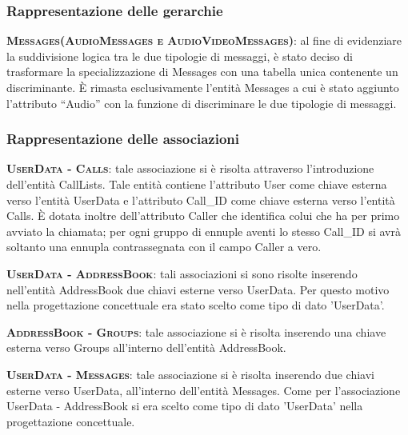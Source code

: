 \subsubsection{Rappresentazione delle gerarchie}

\begin{description}
	\item{\scshape\bfseries Messages(AudioMessages e AudioVideoMessages)}: al fine di evidenziare la suddivisione logica tra le due tipologie di messaggi, è stato deciso di trasformare la specializzazione di Messages con una tabella unica contenente un discriminante. È rimasta esclusivamente l'entità Messages a cui è stato aggiunto l'attributo ``Audio'' con la funzione di discriminare le due tipologie di messaggi.
\end{description}

\subsubsection{Rappresentazione delle associazioni}

\begin{description}
	\item{\scshape\bfseries UserData - Calls}: tale associazione si è risolta attraverso l'introduzione dell'entità CallLists. Tale entità contiene l'attributo User come chiave esterna verso l'entità UserData e l'attributo Call\_ID come chiave esterna verso l'entità Calls. È dotata inoltre dell'attributo Caller che identifica colui che ha per primo avviato la chiamata; per ogni gruppo di ennuple aventi lo stesso Call\_ID si avrà soltanto una ennupla contrassegnata con il campo Caller a vero.
	
	\item{\scshape\bfseries UserData - AddressBook}: tali associazioni si sono risolte inserendo nell'entità AddressBook due chiavi esterne verso UserData. Per questo motivo nella progettazione concettuale era stato scelto come tipo di dato 'UserData'.
	
	\item{\scshape\bfseries AddressBook - Groups}: tale associazione si è risolta inserendo una chiave esterna verso Groups all'interno dell'entità AddressBook.
	
	\item{\scshape\bfseries UserData - Messages}: tale associazione si è risolta inserendo due chiavi esterne verso UserData, all'interno dell'entità Messages. Come per l'associazione UserData - AddressBook si era scelto come tipo di dato 'UserData' nella progettazione concettuale.
\end{description}


